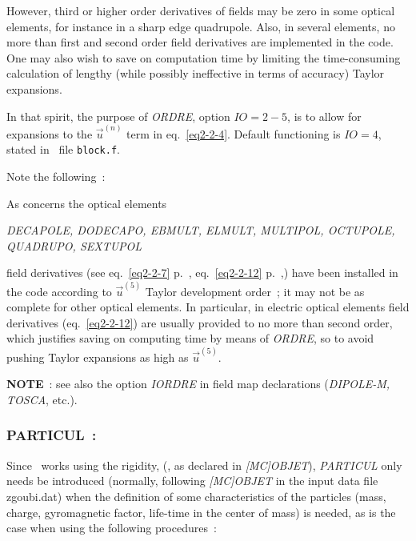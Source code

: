 \noindent However, third or  higher order derivatives of fields  may be zero in some 
optical elements, for instance in a sharp edge quadrupole. Also, in 
several elements, no more than  first and second order field 
derivatives  are implemented in the code.  One may also wish to save on computation time by 
limiting the time-consuming calculation of lengthy (while possibly ineffective in terms 
of accuracy) Taylor expansions. 

\bigskip

\noindent In that spirit, the purpose of \textsl{ORDRE}, option $ IO=2-5$,  is to allow for 
expansions  to the  $ \vec  u^{(n)}$ term  in eq.~\ref{eq2-2-4}. Default functioning 
is $IO=4$, stated in \FORTRAN\ file \texttt{block.f}.

\bigskip

\noindent Note the following~: 

\noindent As concerns the optical elements
\begin{center}
	\textsl{
   DECAPOLE, DODECAPO,  EBMULT, ELMULT, 
	MULTIPOL, OCTUPOLE,   \\
              QUADRUPO, SEXTUPOL}
\end{center}
field derivatives (see eq.~\ref{eq2-2-7} p.~\pageref{eq2-2-7}, eq.~\ref{eq2-2-12} p.~\pageref{eq2-2-12},) 
have been installed in the code according 
to $ \vec  u^{(5)}$ Taylor development order~; it may not 
be as complete for  other optical elements. In particular, 
in electric optical elements field  derivatives (eq.~\ref{eq2-2-12}) are usually provided to no more than second 
order, which justifies saving on computing time by means of \textsl{ORDRE}, 
so to avoid pushing Taylor expansions as high as  $ \vec  u^{(5)}$. 


\bigskip

\noindent\textbf{NOTE}~: see also the option \textsl{IORDRE} in field map
declarations (\textsl{DIPOLE-M, TOSCA}, etc.).  



 \newpage

\subsubsection*{PARTICUL~: \PARTICULTitl}  \label{PARTICUL} 
\medskip 

Since \zgoubi\ works  using the rigidity, (\BORO, as declared in \textsl{[MC]OBJET}), 
\textsl{PARTICUL} only needs  be introduced (normally, following \textsl{[MC]OBJET} in the input data file zgoubi.dat) 
 when  the definition of some characteristics of the particles 
(mass, charge, gyromagnetic factor, life-time in the 
center of mass)  is needed, as is the case when using the following procedures~: 

